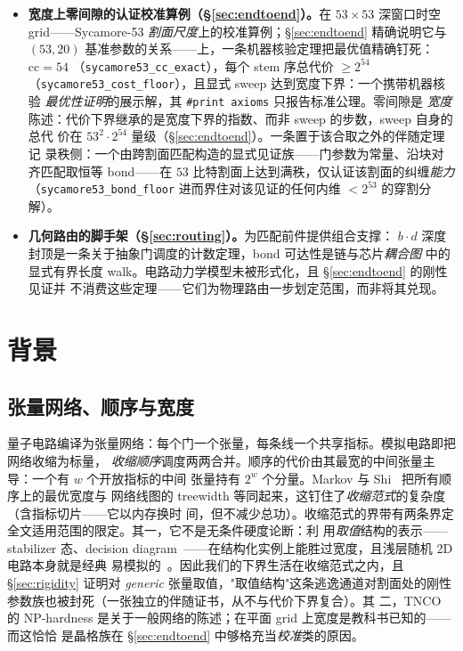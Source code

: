 \documentclass[11pt]{ctexart}
\newcommand{\cc}{\mathrm{cc}}
\begin{document}
\begin{itemize}
    它在基准割面上的存在式实例化由一个在任何平衡割面上都可得的 Bell 型见证兑现，不携带任
    何架构信息（\S\ref{sec:endtoend}）。
  \item \textbf{宽度上零间隙的认证校准算例（\S\ref{sec:endtoend}）。}在 $53\times53$ 深窗口时空
    grid——Sycamore-53 \emph{割面尺度}上的校准算例；\S\ref{sec:endtoend} 精确说明它与
    $(53,20)$ 基准参数的关系——上，一条机器核验定理把最优值精确钉死：$\cc=54$
    （\texttt{sycamore53\_cc\_exact}），每个 stem 序总代价 $\ge 2^{54}$
    （\texttt{sycamore53\_cost\_floor}），且显式 sweep 达到宽度下界：一个携带机器核验
    \emph{最优性证明}的展示解，其 \texttt{\#print axioms} 只报告标准公理。零间隙是
    \emph{宽度}陈述：代价下界继承的是宽度下界的指数、而非 sweep 的步数，sweep 自身的总代
    价在 $53^2\cdot 2^{54}$ 量级（\S\ref{sec:endtoend}）。一条置于该合取之外的伴随定理记
    录秩侧：一个由跨割面匹配构造的显式见证族——门参数为常量、沿块对齐匹配取恒等
    bond——在 $53$ 比特割面上达到满秩，仅认证该割面的纠缠\emph{能力}
    （\texttt{sycamore53\_bond\_floor} 进而界住对该见证的任何内维 $<2^{53}$ 的穿割分解）。
  \item \textbf{几何路由的脚手架（\S\ref{sec:routing}）。}为匹配前件提供组合支撑：
    $b\cdot d$ 深度封顶是一条关于抽象门调度的计数定理，bond 可达性是链与芯片\emph{耦合图}
    中的显式有界长度 walk。电路动力学模型未被形式化，且 \S\ref{sec:endtoend} 的刚性见证并
    不消费这些定理——它们为物理路由一步划定范围，而非将其兑现。
\end{itemize}

\section{背景}\label{sec:background}

\subsection{张量网络、顺序与宽度}
量子电路编译为张量网络：每个门一个张量，每条线一个共享指标。模拟电路即把网络收缩为标量，
\emph{收缩顺序}调度两两合并。顺序的代价由其最宽的中间张量主导：一个有 $w$ 个开放指标的中间
张量持有 $2^w$ 个分量。Markov 与 Shi~\cite{markov2008simulating} 把所有顺序上的最优宽度与
网络线图的 treewidth 等同起来，这钉住了\emph{收缩范式}的复杂度（含指标切片——它以内存换时
间，但不减少总功）。收缩范式的界带有两条界定全文适用范围的限定。其一，它不是无条件硬度论断：利
用\emph{取值}结构的表示——stabilizer 态、decision
diagram~\cite{dd2025treewidth}——在结构化实例上能胜过宽度，且浅层随机 2D 电路本身就是经典
易模拟的~\cite{napp2022efficient}。因此我们的下界生活在收缩范式之内，且
\S\ref{sec:rigidity} 证明对 \emph{generic} 张量取值，"取值结构"这条逃逸通道对割面处的刚性
参数族也被封死（一张独立的伴随证书，从不与代价下界复合）。其
二，TNCO 的 NP-hardness 是关于一般网络的陈述；在平面 grid 上宽度是教科书已知的——而这恰恰
是晶格族在 \S\ref{sec:endtoend} 中够格充当\emph{校准}类的原因。
\end{document}
